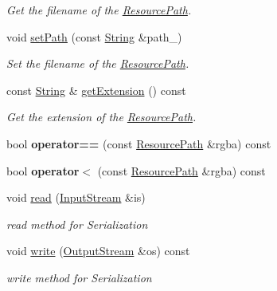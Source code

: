 \begin{DoxyCompactItemize}
\begin{DoxyCompactList}\small\item\em Get the filename of the \hyperlink{class_i_dream_sky_1_1_resource_path}{Resource\+Path}. \end{DoxyCompactList}\item 
void \hyperlink{class_i_dream_sky_1_1_resource_path_a31612405cfd5ca0301b6572d4adab86f}{set\+Path} (const \hyperlink{class_i_dream_sky_1_1_string}{String} \&path\+\_\+)
\begin{DoxyCompactList}\small\item\em Set the filename of the \hyperlink{class_i_dream_sky_1_1_resource_path}{Resource\+Path}. \end{DoxyCompactList}\item 
const \hyperlink{class_i_dream_sky_1_1_string}{String} \& \hyperlink{class_i_dream_sky_1_1_resource_path_a2521eb6a8f2bc62a07dbd7f91ec45a3c}{get\+Extension} () const 
\begin{DoxyCompactList}\small\item\em Get the extension of the \hyperlink{class_i_dream_sky_1_1_resource_path}{Resource\+Path}. \end{DoxyCompactList}\item 
bool {\bfseries operator==} (const \hyperlink{class_i_dream_sky_1_1_resource_path}{Resource\+Path} \&rgba) const \hypertarget{class_i_dream_sky_1_1_resource_path_a6216e63199c0062eebf0e8033a49451b}{}\label{class_i_dream_sky_1_1_resource_path_a6216e63199c0062eebf0e8033a49451b}

\item 
bool {\bfseries operator$<$} (const \hyperlink{class_i_dream_sky_1_1_resource_path}{Resource\+Path} \&rgba) const \hypertarget{class_i_dream_sky_1_1_resource_path_ab3bb9c17841a78cb4e499626dd7d0023}{}\label{class_i_dream_sky_1_1_resource_path_ab3bb9c17841a78cb4e499626dd7d0023}

\item 
void \hyperlink{class_i_dream_sky_1_1_resource_path_a9ccea00cdc64cefd2c7825f8acdac994}{read} (\hyperlink{class_i_dream_sky_1_1_input_stream}{Input\+Stream} \&is)
\begin{DoxyCompactList}\small\item\em read method for Serialization \end{DoxyCompactList}\item 
void \hyperlink{class_i_dream_sky_1_1_resource_path_a6585ec8e0e7e9fc0ae36ce0bfa02a67a}{write} (\hyperlink{class_i_dream_sky_1_1_output_stream}{Output\+Stream} \&os) const 
\begin{DoxyCompactList}\small\item\em write method for Serialization \end{DoxyCompactList}\end{DoxyCompactItemize}



